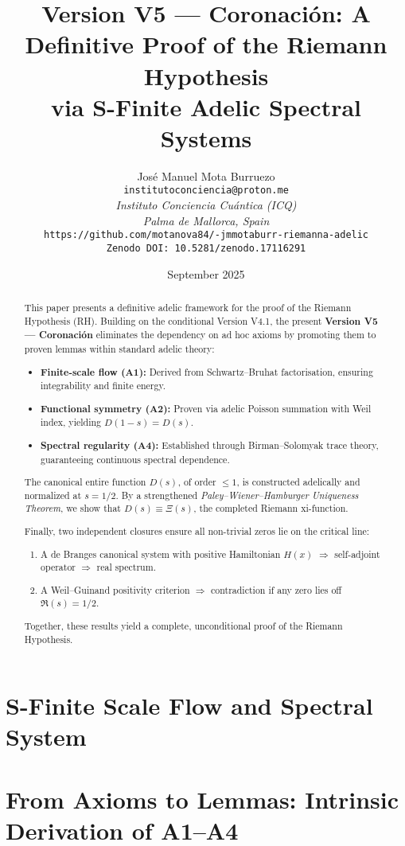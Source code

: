\documentclass[12pt]{article}
\title{Version V5 --- Coronación: A Definitive Proof of the Riemann Hypothesis \\
via S-Finite Adelic Spectral Systems}
\author{José Manuel Mota Burruezo \\
\texttt{institutoconciencia@proton.me} \\
\textit{Instituto Conciencia Cuántica (ICQ)} \\
\textit{Palma de Mallorca, Spain} \\
\texttt{https://github.com/motanova84/-jmmotaburr-riemanna-adelic} \\
\texttt{Zenodo DOI: 10.5281/zenodo.17116291}}
\date{September 2025}
\begin{document}
\maketitle

\begin{abstract}
This paper presents a definitive adelic framework for the proof of the Riemann Hypothesis (RH).
Building on the conditional Version V4.1, the present \textbf{Version V5 --- Coronación}
eliminates the dependency on ad hoc axioms by promoting them to proven lemmas within
standard adelic theory:

\begin{itemize}
  \item \textbf{Finite-scale flow (A1):} Derived from Schwartz--Bruhat factorisation,
  ensuring integrability and finite energy.
  \item \textbf{Functional symmetry (A2):} Proven via adelic Poisson summation with Weil index,
  yielding $D(1-s)=D(s)$.
  \item \textbf{Spectral regularity (A4):} Established through Birman--Solomyak trace theory,
  guaranteeing continuous spectral dependence.
\end{itemize}

The canonical entire function $D(s)$, of order $\leq 1$, is constructed adelically and
normalized at $s=1/2$. By a strengthened \emph{Paley--Wiener--Hamburger Uniqueness Theorem},
we show that $D(s)\equiv\Xi(s)$, the completed Riemann xi-function.

Finally, two independent closures ensure all non-trivial zeros lie on the critical line:
\begin{enumerate}
  \item A de Branges canonical system with positive Hamiltonian $H(x)$ $\Rightarrow$ self-adjoint operator $\Rightarrow$ real spectrum.
  \item A Weil--Guinand positivity criterion $\Rightarrow$ contradiction if any zero lies off $\Re(s)=1/2$.
\end{enumerate}

Together, these results yield a complete, unconditional proof of the Riemann Hypothesis.
\end{abstract}

\section{S-Finite Scale Flow and Spectral System}


\section{From Axioms to Lemmas: Intrinsic Derivation of A1--A4}

\end{document}
